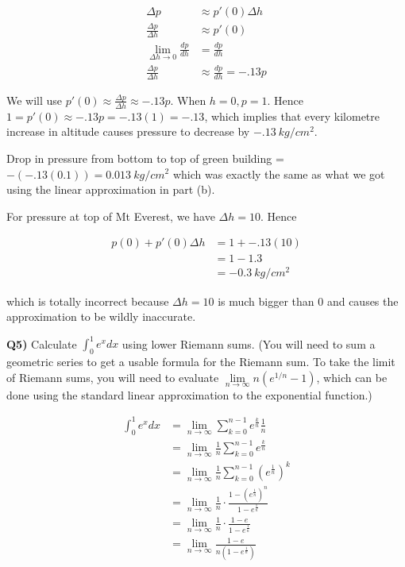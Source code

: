 \documentclass[9pt]{article}
\begin{document}
\begin{align*}
  \Delta p &\approx p'(0)\Delta h\\
  \frac{\Delta p}{\Delta h} &\approx p'(0)\\
  \lim_{\Delta h \rightarrow 0} \frac{dp}{dh} &= \frac{dp}{dh}\\
  \frac{\Delta p}{\Delta h} &\approx \frac{dp}{dh} = -.13p
\end{align*}

We will use $p'(0) \approx \frac{\Delta p}{\Delta h} \approx -.13p$. When $h = 0, p = 1$. Hence $1 = p'(0) \approx -.13p = -.13(1) = -.13$, which implies that every kilometre increase in altitude causes pressure to decrease by $-.13\ kg/cm^2$.

Drop in pressure from bottom to top of green building = $-(-.13(0.1)) = 0.013\ kg/cm^2$ which was exactly the same as what we got using the linear approximation in part (b).

For pressure at top of Mt Everest, we have $\Delta h = 10$. Hence

\begin{align*}
  p(0) + p'(0)\Delta h &= 1 + -.13(10)\\
                       &= 1 - 1.3\\
                       &= -0.3\ kg/cm^2
\end{align*}

which is totally incorrect because $\Delta h = 10$ is much bigger than $0$ and causes the approximation to be wildly inaccurate.


\begin{tcolorbox}
  \textbf{Q5)} Calculate $\int_{0}^{1} e^x dx$ using lower Riemann sums. (You will need to sum a geometric series to get a usable formula for the Riemann sum. To take the limit of Riemann sums, you will need to evaluate $\lim\limits_{n \to \infty} n(e^{1/n} - 1)$, which can be done using the standard linear approximation to the exponential function.)
\end{tcolorbox}

\begin{align*}
  \int_{0}^{1} e^x dx &= \lim\limits_{n \to \infty} \sum_{k=0}^{n-1} e^{\frac{k}{n}} \frac{1}{n}\\
                      &= \lim\limits_{n \to \infty} \frac{1}{n} \sum_{k=0}^{n-1} e^{\frac{k}{n}}\\
                      &= \lim\limits_{n \to \infty} \frac{1}{n} \sum_{k=0}^{n-1} (e^{\frac{1}{n}})^k\\
                      &= \lim\limits_{n \to \infty} \frac{1}{n} \cdot \frac{1 - (e^{\frac{1}{n}})^n}{1 - e^{\frac{1}{n}}}\\
                      &= \lim\limits_{n \to \infty} \frac{1}{n} \cdot \frac{1 - e}{1 - e^\frac{1}{n}}\\
                      &= \lim\limits_{n \to \infty} \frac{1 - e}{n(1 - e^{\frac{1}{n}})}
\end{align*}
\end{document}
